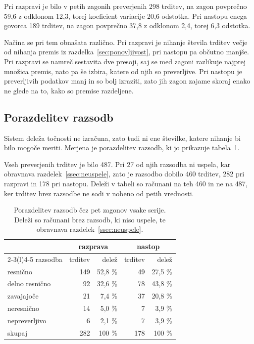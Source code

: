 \documentclass[a4paper, 12pt]{book}
\begin{document}
Pri razpravi je bilo v petih zagonih preverjenih 298 trditev, na zagon
povprečno 59,6 z odklonom 12,3, torej koeficient variacije 20,6 odstotka. Pri
nastopu enega govorca 189 trditev, na zagon povprečno 37,8 z odklonom 2,4, torej
6,3 odstotka.

Načina se pri tem obnašata različno. Pri razpravi je nihanje števila trditev
večje od nihanja premis iz razdelka~\ref{sec:ponovljivost}, pri nastopu pa
občutno manjše. Pri razpravi se namreč sestavita dve presoji, saj se med zagoni
razlikuje najprej množica premis, nato pa še izbira, katere od njih so
preverljive. Pri nastopu je preverljivih podatkov manj in so bolj izraziti,
zato jih zagon zajame skoraj enako ne glede na to, kako so premise razdeljene.



\subsection{Porazdelitev razsodb}
\label{ssec:razsodbe-meritev}

Sistem deleža točnosti ne izračuna, zato tudi ni ene številke, katere nihanje bi
bilo mogoče meriti. Merjena je porazdelitev razsodb, ki jo prikazuje
tabela~\ref{tbl:zbirka}.

Vseh preverjenih trditev je bilo 487. Pri 27 od njih razsodba ni uspela, kar
obravnava razdelek~\ref{ssec:neuspele}, zato je razsodbo dobilo 460 trditev,
282 pri razpravi in 178 pri nastopu. Deleži v tabeli so računani na teh 460 in
ne na 487, ker trditev brez razsodbe ne sodi v nobeno od petih vrednosti.

\begin{table}[H]
\centering
\begin{tabular}{lrrrr}
\toprule
& \multicolumn{2}{c}{razprava} & \multicolumn{2}{c}{nastop} \\
\cmidrule(lr){2-3}\cmidrule(l){4-5}
razsodba & trditev & delež & trditev & delež \\
\midrule
resnično           & 149 & 52,8 \% & 49 & 27,5 \% \\
delno resnično     & 92 & 32,6 \% & 78 & 43,8 \% \\
zavajajoče     & 21 & 7,4 \% & 37 & 20,8 \% \\
neresnično        & 14 & 5,0 \% & 7 & 3,9 \% \\
nepreverljivo  & 6 & 2,1 \% & 7 & 3,9 \% \\
\midrule
skupaj         & 282 & 100 \% & 178 & 100 \% \\
\bottomrule
\end{tabular}
\caption{Porazdelitev razsodb čez pet zagonov vsake serije. Deleži so računani
brez razsodb, ki niso uspele, te obravnava
razdelek~\ref{ssec:neuspele}.}
\label{tbl:zbirka}
\end{table}
\end{document}
